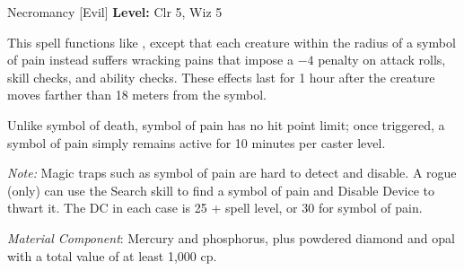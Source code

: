 {Necromancy [Evil]}
{
	\textbf{Level:}
	Clr 5, Wiz 5\\
}
{
	This spell functions like , except that each creature within the radius of a symbol of pain instead suffers wracking pains that impose a $-4$ penalty on attack rolls, skill checks, and ability checks. These effects last for 1 hour after the creature moves farther than 18 meters from the symbol.

	Unlike symbol of death, symbol of pain has no hit point limit; once triggered, a symbol of pain simply remains active for 10 minutes per caster level.

	\textit{Note:} Magic traps such as symbol of pain are hard to detect and disable. A rogue (only) can use the Search skill to find a symbol of pain and Disable Device to thwart it. The DC in each case is 25 + spell level, or 30 for symbol of pain.

	\textit{Material Component}:
	Mercury and phosphorus, plus powdered diamond and opal with a total value of at least 1,000 cp.

}
